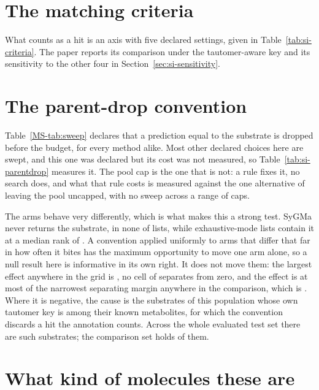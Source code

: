 \documentclass[journal=jcisd8,manuscript=suppinfo,layout=onecolumn]{achemso}
\begin{document}
\section{The matching criteria}
\label{sec:si-criteria}



What counts as a hit is an axis with five declared settings, given in Table~\ref{tab:si-criteria}.
The paper reports its comparison under the tautomer-aware key and its sensitivity to the other
four in Section~\ref{sec:si-sensitivity}.

\section{The parent-drop convention}
\label{sec:si-parentdrop}



Table~\ref{MS-tab:sweep} declares that a prediction equal to the substrate is dropped before the
budget, for every
method alike. Most other declared choices here are swept, and this one was declared but its cost
was not measured, so Table~\ref{tab:si-parentdrop} measures it. The pool cap is the one that is
not: a rule fixes it, no search does, and what that rule costs is measured against the one
alternative of leaving the pool uncapped, with no sweep across a range of caps.

The arms behave very differently, which is what makes this a strong test.
SyGMa never returns the substrate, in none of \numPopulationN{} lists, while
\numPdropReturnsBank{} exhaustive-mode lists contain it at a median rank of
\numPdropMedrankBank{}. A convention applied uniformly to arms that differ that far in how often
it bites has the maximum opportunity to move one arm alone, so a null result here is
informative in its own right. It does not move them: the
largest effect anywhere in the grid is \numPdropMaxEffect{}, no cell of
\numPdropCells{} separates from zero, and the effect is at most \numPdropShareofmarginPct{} of the
narrowest
separating margin anywhere in the comparison, which is \numPdropNarrowestmargin{}. Where it is
negative, the cause is the \numPdropSelfref{} substrates of this population whose
own tautomer key is among their known metabolites, for which the convention discards a hit the
annotation counts. Across the whole evaluated test set there are \numRefauditSelfref{} such
substrates; the comparison set holds \numPdropSelfref{} of them.

\section{What kind of molecules these are}
\label{sec:si-applicability}
\end{document}
